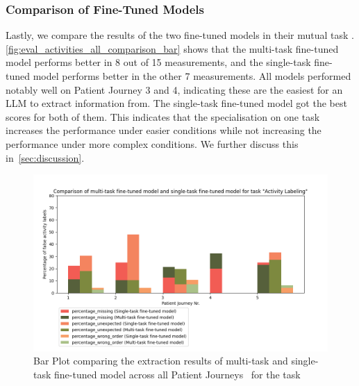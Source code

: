\subsubsection{Comparison of Fine-Tuned Models}
Lastly, we compare the results of the two fine-tuned models in their mutual task . \autoref{fig:eval_activities_all_comparison_bar} shows that the multi-task fine-tuned model performs better in 8 out of 15 measurements, and the single-task fine-tuned model performs better in the other 7 measurements. All models performed notably well on Patient Journey 3 and 4, indicating these are the easiest for an LLM to extract information from. The single-task fine-tuned model got the best scores for both of them. This indicates that the specialisation on one task increases the performance under easier conditions while not increasing the performance under more complex conditions. We further discuss this in~\autoref{sec:discussion}.

\begin{figure}[h]
    \centering
    \captionsetup{belowskip=0pt,aboveskip=0pt}
    \includegraphics[width=\textwidth]{bachelor_thesis/images/activites_all-single_vs_multi.png}
    \caption{Bar Plot comparing the extraction results of multi-task and single-task fine-tuned model across all Patient Journeys~ for the task } 
    \label{fig:eval_activities_all_comparison_bar}
\end{figure}
